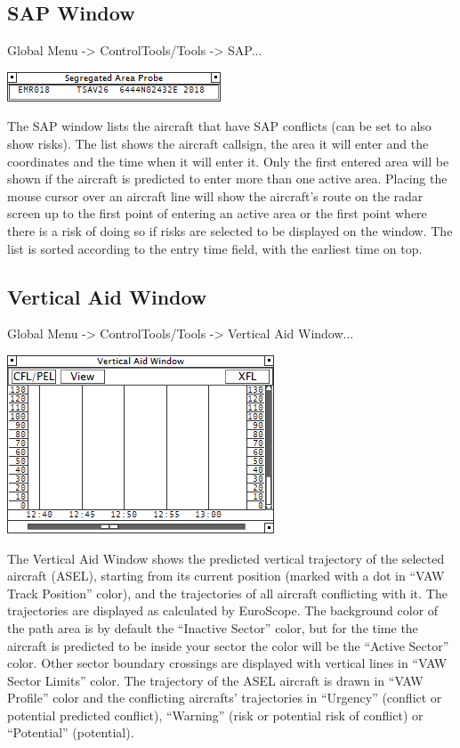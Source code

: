 \documentclass[11pt,a4paper]{memoir}
\begin{document}
\subsection{SAP Window}
\label{win:sap}

Global Menu -> ControlTools/Tools -> SAP...

\includegraphics{img/sap.png}

The SAP window lists the aircraft that have SAP conflicts (can be set to also show risks). The list shows the aircraft callsign, the area it will enter and the coordinates and the time when it will enter it. Only the first entered area will be shown if the aircraft is predicted to enter more than one active area. Placing the mouse cursor over an aircraft line will show the aircraft’s route on the radar screen up to the first point of entering an active area or the first point where there is a risk of doing so if risks are selected to be displayed on the window. The list is sorted according to the entry time field, with the earliest time on top.

\subsection{Vertical Aid Window}
\label{win:vaw}

Global Menu -> ControlTools/Tools -> Vertical Aid Window...

\includegraphics{img/vaw.png}

The Vertical Aid Window shows the predicted vertical trajectory of the selected aircraft (ASEL), starting from its current position (marked with a dot in “VAW Track Position” color), and the trajectories of all aircraft conflicting with it. The trajectories are displayed as calculated by EuroScope. The background color of the path area is by default the “Inactive Sector” color, but for the time the aircraft is predicted to be inside your sector the color will be the “Active Sector” color. Other sector boundary crossings are displayed with vertical lines in “VAW Sector Limits” color. The trajectory of the ASEL aircraft is drawn in “VAW Profile” color and the conflicting aircrafts’ trajectories in “Urgency” (conflict or potential predicted conflict), “Warning” (risk or potential risk of conflict) or “Potential” (potential).
\end{document}
